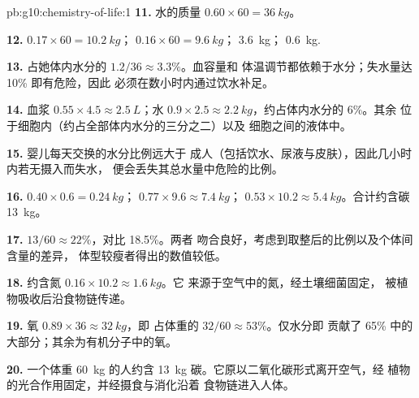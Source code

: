 \begin{solution}{pb:g10:chemistry-of-life:1}
\textbf{11.} 水的质量 $0.60 \times 60 = \qty{36}{kg}$。

\textbf{12.}  $0.17 \times 60 = \qty{10.2}{kg}$； $0.16
\times 60 = \qty{9.6}{kg}$； \qty{3.6}{kg}；
\qty{0.6}{kg}.

\textbf{13.} 占她体内水分的 $1.2/36 \approx 3.3\%$。血容量和
体温调节都依赖于水分；失水量达 10\% 即有危险，因此
必须在数小时内通过饮水补足。

\textbf{14.} 血浆 $0.55 \times 4.5 \approx \qty{2.5}{L}$；水 $0.9
\times 2.5 \approx \qty{2.2}{kg}$，约占体内水分的 6\%。其余
位于细胞内（约占全部体内水分的三分之二）以及
细胞之间的液体中。

\textbf{15.} 婴儿每天交换的水分比例远大于
成人（包括饮水、尿液与皮肤），因此几小时内若无摄入而失水，
便会丢失其总水量中危险的比例。

\textbf{16.}  $0.40 \times 0.6 = \qty{0.24}{kg}$；
$0.77 \times 9.6 \approx \qty{7.4}{kg}$； $0.53 \times 10.2
\approx \qty{5.4}{kg}$。合计约含碳 \qty{13}{kg}。

\textbf{17.} $13/60 \approx 22\%$，对比 18.5\%。两者
吻合良好，考虑到取整后的比例以及个体间含量的差异，
体型较瘦者得出的数值较低。

\textbf{18.} 约含氮 $0.16 \times 10.2 \approx \qty{1.6}{kg}$。它
来源于空气中的氮，经土壤细菌固定，
被植物吸收后沿食物链传递。

\textbf{19.} 氧 $0.89 \times 36 \approx \qty{32}{kg}$，即
占体重的 $32/60 \approx 53\%$。仅水分即
贡献了 65\% 中的大部分；其余为有机分子中的氧。

\textbf{20.} 一个体重 \qty{60}{kg} 的人约含
\qty{13}{kg} 碳。它原以二氧化碳形式离开空气，经
植物的光合作用固定，并经摄食与消化沿着
食物链进入人体。
\end{solution}
